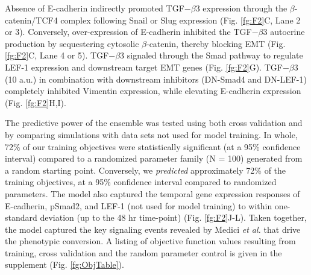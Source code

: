 \documentclass[12pt]{article}
\begin{document}
Absence of E-cadherin indirectly promoted TGF$-\beta$3 expression through the $\beta$-catenin/TCF4 complex following Snail or Slug expression (Fig. \ref{fg:F2}C, Lane 2 or 3).
Conversely, over-expression of E-cadherin inhibited the TGF$-\beta$3 autocrine production by sequestering cytosolic $\beta$-catenin, thereby blocking EMT (Fig. \ref{fg:F2}C, Lane 4 or 5).
TGF$-\beta$3 signaled through the Smad pathway to regulate LEF-1 expression and downstream target EMT genes (Fig. \ref{fg:F2}G).
TGF$-\beta$3 (10 a.u.) in combination with downstream inhibitors (DN-Smad4 and DN-LEF-1) completely inhibited Vimentin expression, while elevating E-cadherin expression (Fig. \ref{fg:F2}H,I).

The predictive power of the ensemble was tested using both cross validation and by comparing simulations with data sets not used for model training.
In whole, 72\% of our training objectives were statistically significant (at a 95\% confidence interval) compared to a randomized parameter family (N = 100)
generated from a random starting point. Conversely, we \emph{predicted} approximately 72\% of the training objectives, at a 95\% confidence interval compared to randomized parameters.
The model also captured the temporal gene expression responses of E-cadherin, pSmad2, and LEF-1 (not used for model training) to within one-standard deviation (up to the 48 hr time-point) (Fig. \ref{fg:F2}J-L). Taken together, the model captured the key signaling events revealed by Medici \emph{et al.} \citep{Medici:2008fk} that drive the phenotypic conversion.
A listing of objective function values resulting from training, cross validation and the random parameter control is given in the supplement (Fig. \ref{fg:ObjTable}).
\end{document}
